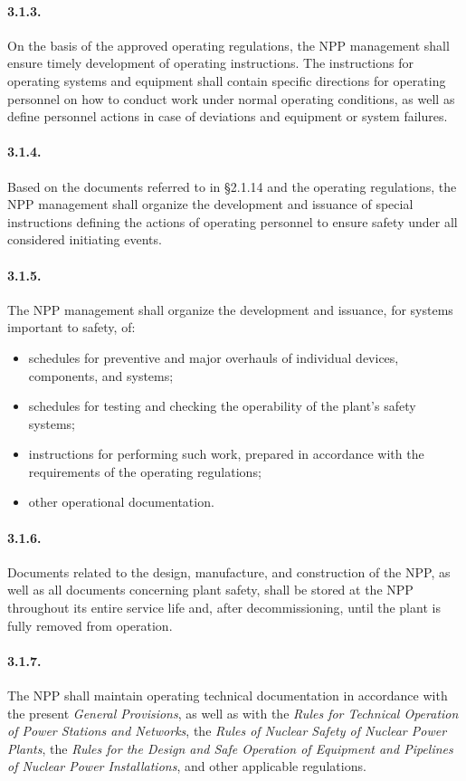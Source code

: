 \documentclass[openright]{bookest}
\begin{document}
\paragraph{3.1.3.}
On the basis of the approved operating regulations, the NPP management shall ensure timely development of operating instructions.  
The instructions for operating systems and equipment shall contain specific directions for operating personnel on how to conduct work under normal operating conditions, as well as define personnel actions in case of deviations and equipment or system failures.

\paragraph{3.1.4.}
Based on the documents referred to in §2.1.14 and the operating regulations, the NPP management shall organize the development and issuance of special instructions defining the actions of operating personnel to ensure safety under all considered initiating events.

\paragraph{3.1.5.}
The NPP management shall organize the development and issuance, for systems important to safety, of:
\begin{itemize}
    \item schedules for preventive and major overhauls of individual devices, components, and systems;
    \item schedules for testing and checking the operability of the plant's safety systems;
    \item instructions for performing such work, prepared in accordance with the requirements of the operating regulations;
    \item other operational documentation.
\end{itemize}

\paragraph{3.1.6.}
Documents related to the design, manufacture, and construction of the NPP, as well as all documents concerning plant safety, shall be stored at the NPP throughout its entire service life and, after decommissioning, until the plant is fully removed from operation.

\paragraph{3.1.7.}
The NPP shall maintain operating technical documentation in accordance with the present \textit{General Provisions}, as well as with the \textit{Rules for Technical Operation of Power Stations and Networks}, the \textit{Rules of Nuclear Safety of Nuclear Power Plants}, the \textit{Rules for the Design and Safe Operation of Equipment and Pipelines of Nuclear Power Installations}, and other applicable regulations.
\end{document}
